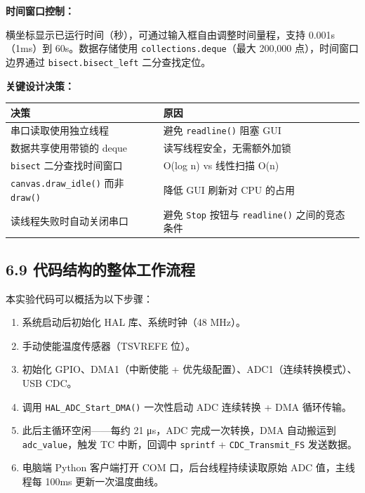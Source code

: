 \documentclass[
  chinese,
  UTF8,
  oneside,
  openany]{ctexbook}
\providecommand{\tightlist}{%
  \setlength{\itemsep}{0pt}\setlength{\parskip}{0pt}}
\begin{document}
\textbf{时间窗口控制：}

横坐标显示已运行时间（秒），可通过输入框自由调整时间量程，支持
0.001s（1ms）到 60s。数据存储使用 \texttt{collections.deque}（最大
200,000 点），时间窗口边界通过 \texttt{bisect.bisect\_left}
二分查找定位。

\textbf{关键设计决策：}

\begin{longtable}[]{@{}
  >{\raggedright\arraybackslash}p{}
  >{\raggedright\arraybackslash}p{}@{}}
\toprule\noalign{}
\begin{minipage}[b]{\linewidth}\raggedright
决策
\end{minipage} & \begin{minipage}[b]{\linewidth}\raggedright
原因
\end{minipage} \\
\midrule\noalign{}
\endhead
\bottomrule\noalign{}
\endlastfoot
串口读取使用独立线程 & 避免 \texttt{readline()} 阻塞 GUI \\
数据共享使用带锁的 deque & 读写线程安全，无需额外加锁 \\
\texttt{bisect} 二分查找时间窗口 & O(log n) vs 线性扫描 O(n) \\
\texttt{canvas.draw\_idle()} 而非 \texttt{draw()} & 降低 GUI 刷新对 CPU
的占用 \\
读线程失败时自动关闭串口 & 避免 \texttt{Stop} 按钮与 \texttt{readline()}
之间的竞态条件 \\
\end{longtable}

\subsection{6.9
代码结构的整体工作流程}\label{ux4ee3ux7801ux7ed3ux6784ux7684ux6574ux4f53ux5de5ux4f5cux6d41ux7a0b-2}

本实验代码可以概括为以下步骤：

\begin{enumerate}
\def\labelenumi{\arabic{enumi}.}
\tightlist
\item
  系统启动后初始化 HAL 库、系统时钟（48 MHz）。
\item
  手动使能温度传感器（TSVREFE 位）。
\item
  初始化 GPIO、DMA1（中断使能 + 优先级配置）、ADC1（连续转换模式）、USB
  CDC。
\item
  调用 \texttt{HAL\_ADC\_Start\_DMA()} 一次性启动 ADC 连续转换 + DMA
  循环传输。
\item
  此后主循环空闲------每约 21 μs，ADC 完成一次转换，DMA 自动搬运到
  \texttt{adc\_value}，触发 TC 中断，回调中 \texttt{sprintf} +
  \texttt{CDC\_Transmit\_FS} 发送数据。
\item
  电脑端 Python 客户端打开 COM 口，后台线程持续读取原始 ADC 值，主线程每
  100ms 更新一次温度曲线。
\end{enumerate}
\end{document}
